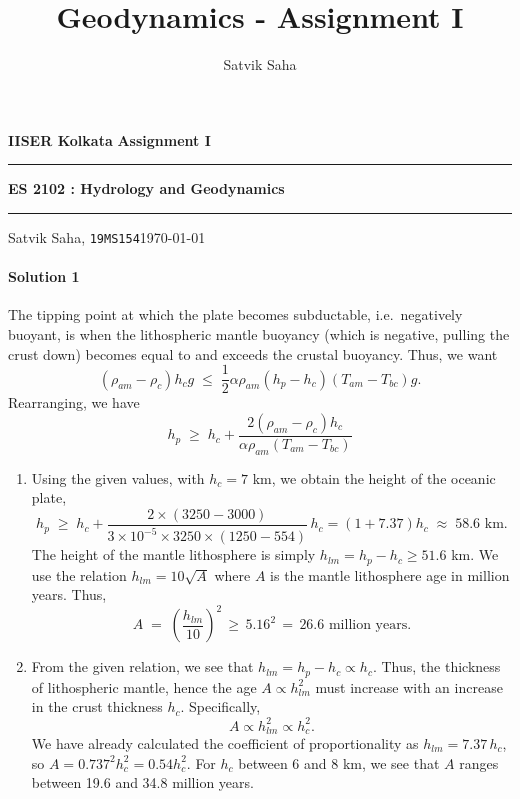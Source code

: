 \documentclass[10pt]{article}
\title{Geodynamics - Assignment I}
\author{Satvik Saha}
\date{}
\begin{document}
        \par\textbf{IISER Kolkata} \hfill \textbf{Assignment I}
        \vspace{3pt}
        \hrule
        \vspace{3pt}
        \begin{center}
                \LARGE{\textbf{ES 2102 : Hydrology and Geodynamics}}
        \end{center}
        \vspace{3pt}
        \hrule
        \vspace{3pt}
        Satvik Saha, \texttt{19MS154}\hfill\today
        \vspace{20pt}

        \paragraph{Solution 1} The tipping point at which the plate becomes subductable, i.e.\ negatively buoyant, is when the
        lithospheric mantle buoyancy (which is negative, pulling the crust down) becomes equal to and exceeds the crustal buoyancy. Thus, we want
        \[
                (\rho_{am} - \rho_c)h_c g \;\leq\; \frac{1}{2}\alpha\rho_{am}(h_p - h_c)(T_{am} - T_{bc})g.
        \]
        Rearranging, we have
        \[
                h_p \;\geq\; h_c + \frac{2(\rho_{am} - \rho_c)h_c}{\alpha\rho_{am}(T_{am} - T_{bc})}
        \]
        \begin{enumerate}
                \item Using the given values, with $h_c = 7$ km, we obtain the height of the oceanic plate,
                \[
                        h_p \;\geq\; h_c + \frac{2\times(3250 - 3000)}{3\times 10^{-5}\times 3250 \times (1250 - 554)}\,h_c = (1 + 7.37) h_c
                                \;\approx\; 58.6 \text{ km}.
                \]
                The height of the mantle lithosphere is simply $h_{lm} = h_p - h_c \geq 51.6$ km. We use the relation $h_{lm} = 10\sqrt{A}$
                where $A$ is the mantle lithosphere age in million years. Thus,
                \[
                        A \;=\; \left(\frac{h_{lm}}{10}\right)^2 \,\geq\, 5.16^2 \,=\, 26.6\text{ million years}.
                \]
                \item From the given relation, we see that $h_{lm} = h_p - h_c \propto h_c$. Thus, the thickness of lithospheric mantle, hence
                the age $A \propto h_{lm}^2$ must increase with an increase in the crust thickness $h_c$. Specifically,
                \[
                        A \propto h_{lm}^2 \propto h_c^2.
                \]
                We have already calculated the coefficient of proportionality as $h_{lm} = 7.37\, h_c$, so $A = 0.737^2 h_c^2 = 0.54 h_c^2$.
                For $h_c$ between $6$ and $8$ km, we see that $A$ ranges between 19.6 and 34.8 million years.
        \end{enumerate}
\end{document}
